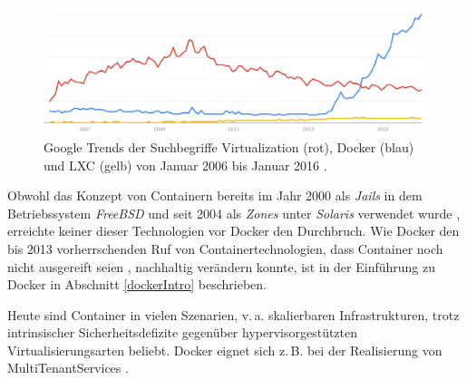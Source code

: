 \documentclass[../main.tex]{subfiles}
\begin{document}
  \begin{figure}[h]
      \centering
      \includegraphics[width=1.0\textwidth]{./images/googletrend_dockerVirtualizationLXC.png}
      \caption{Google Trends der Suchbegriffe \glqq{}Virtualization\grqq{} (rot), \glqq{}Docker\grqq{} (blau) und \glqq{}\acrshort{LXC}\grqq{} (gelb) von Januar 2006 bis Januar 2016 \cite{googleTrends}.}
      \label{fig:overview_googleTrends}
  \end{figure}

  Obwohl das Konzept von Containern bereits im Jahr 2000 als \emph{Jails} in dem Betriebssystem \emph{Free\acrshort{BSD}} und seit 2004 als \emph{Zones} unter \emph{Solaris} verwendet wurde \cite{zonesReleasenotes}\cite{jailsReleasenotes}, erreichte keiner dieser Technologien vor Docker den Durchbruch. Wie Docker den bis 2013 vorherrschenden Ruf von Containertechnologien, dass Container noch nicht ausgereift seien \cite[S.8]{containerVirtPerformance}, nachhaltig verändern konnte, ist in der Einführung zu Docker in Abschnitt \ref{dockerIntro} beschrieben.

  Heute sind Container in vielen Szenarien, v.\,a. skalierbaren Infrastrukturen, trotz intrinsischer Sicherheitsdefizite gegenüber hypervisorgestützten Virtualisierungsarten beliebt. Docker eignet sich z.\,B. bei der Realisierung von \glspl{MultiTenantService} \cite[S.6]{dockerBook}\cite{dockerUnderstandingDocker}.

\end{document}
